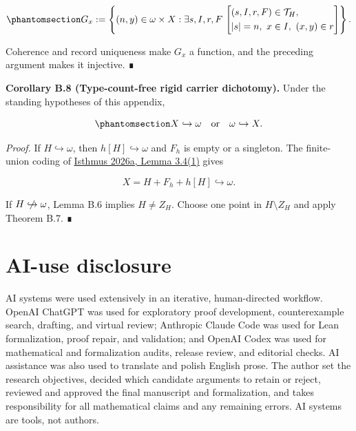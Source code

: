 \documentclass[
  english,
  11pt,
  reqno]{amsart}
\providecommand{\nhookrightarrow}{\centernot\hookrightarrow}
\begin{document}
\begin{equation}\protect\phantomsection\label{eq:typefree-off-center-graph}{
G_x
:=
\left\{
(n,y)\in\omega\times X:
\exists s,I,r,F\,
\left[
\begin{aligned}
 &(s,I,r,F)\in\mathcal T_H,\\
 &|s|=n,\ x\in I,\ (x,y)\in r
\end{aligned}
\right]
\right\}.
}\end{equation}

Coherence and record uniqueness make \(G_x\) a function, and the
preceding argument makes it injective. ∎

\protect{}\label{cor:b-8-dyadic-dichotomy}

\textbf{Corollary B.8 (Type-count-free rigid carrier dichotomy).} Under
the standing hypotheses of this appendix,

\begin{equation}\protect\phantomsection\label{eq:typefree-rigid-dichotomy}{
X\hookrightarrow\omega
\quad\text{or}\quad
\omega\hookrightarrow X.
}\end{equation}

\emph{Proof.} If \(H\hookrightarrow\omega\), then
\(h[H]\hookrightarrow\omega\) and \(F_h\) is empty or a singleton. The
finite-union coding of \hyperref[ref:isthmus2026a]{Isthmus 2026a, Lemma
3.4(1)} gives

\[
X=H+F_h+h[H]\hookrightarrow\omega.
\]

If \(H\nhookrightarrow\omega\), Lemma B.6 implies \(H\ne Z_H\). Choose
one point in \(H\setminus Z_H\) and apply Theorem B.7. ∎

\protect{}\label{sec:ai-disclosure}

\section*{AI-use disclosure}\label{ai-use-disclosure}

AI systems were used extensively in an iterative, human-directed
workflow. OpenAI ChatGPT was used for exploratory proof development,
counterexample search, drafting, and virtual review; Anthropic Claude
Code was used for Lean formalization, proof repair, and validation; and
OpenAI Codex was used for mathematical and formalization audits, release
review, and editorial checks. AI assistance was also used to translate
and polish English prose. The author set the research objectives,
decided which candidate arguments to retain or reject, reviewed and
approved the final manuscript and formalization, and takes
responsibility for all mathematical claims and any remaining errors. AI
systems are tools, not authors.
\end{document}
